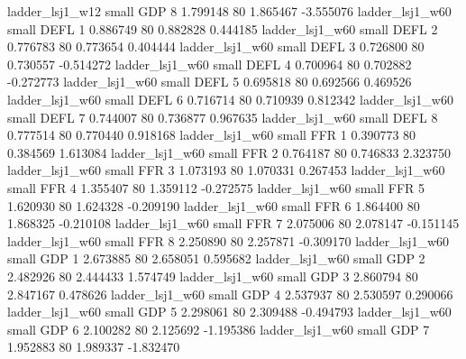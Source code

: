          ladder_lsj1_w12      small      GDP                 8 1.799148 80       1.865467          -3.555076
         ladder_lsj1_w60      small     DEFL                 1 0.886749 80       0.882828           0.444185
         ladder_lsj1_w60      small     DEFL                 2 0.776783 80       0.773654           0.404444
         ladder_lsj1_w60      small     DEFL                 3 0.726800 80       0.730557          -0.514272
         ladder_lsj1_w60      small     DEFL                 4 0.700964 80       0.702882          -0.272773
         ladder_lsj1_w60      small     DEFL                 5 0.695818 80       0.692566           0.469526
         ladder_lsj1_w60      small     DEFL                 6 0.716714 80       0.710939           0.812342
         ladder_lsj1_w60      small     DEFL                 7 0.744007 80       0.736877           0.967635
         ladder_lsj1_w60      small     DEFL                 8 0.777514 80       0.770440           0.918168
         ladder_lsj1_w60      small      FFR                 1 0.390773 80       0.384569           1.613084
         ladder_lsj1_w60      small      FFR                 2 0.764187 80       0.746833           2.323750
         ladder_lsj1_w60      small      FFR                 3 1.073193 80       1.070331           0.267453
         ladder_lsj1_w60      small      FFR                 4 1.355407 80       1.359112          -0.272575
         ladder_lsj1_w60      small      FFR                 5 1.620930 80       1.624328          -0.209190
         ladder_lsj1_w60      small      FFR                 6 1.864400 80       1.868325          -0.210108
         ladder_lsj1_w60      small      FFR                 7 2.075006 80       2.078147          -0.151145
         ladder_lsj1_w60      small      FFR                 8 2.250890 80       2.257871          -0.309170
         ladder_lsj1_w60      small      GDP                 1 2.673885 80       2.658051           0.595682
         ladder_lsj1_w60      small      GDP                 2 2.482926 80       2.444433           1.574749
         ladder_lsj1_w60      small      GDP                 3 2.860794 80       2.847167           0.478626
         ladder_lsj1_w60      small      GDP                 4 2.537937 80       2.530597           0.290066
         ladder_lsj1_w60      small      GDP                 5 2.298061 80       2.309488          -0.494793
         ladder_lsj1_w60      small      GDP                 6 2.100282 80       2.125692          -1.195386
         ladder_lsj1_w60      small      GDP                 7 1.952883 80       1.989337          -1.832470

